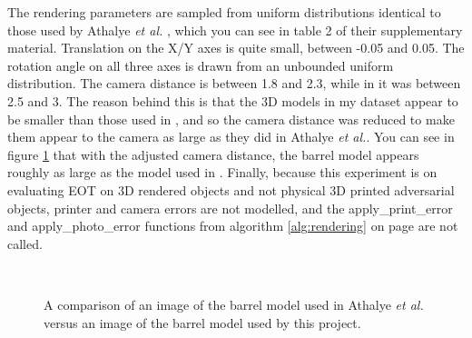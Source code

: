 The rendering parameters are sampled from uniform distributions identical to those used by Athalye \textit{et al.} \cite{athalye}, which you can see in table 2 of their supplementary material. Translation on the X/Y axes is quite small, between -0.05 and 0.05. The rotation angle on all three axes is drawn from an unbounded uniform distribution. The camera distance is between 1.8 and 2.3, while in \cite{athalye} it was between 2.5 and 3. The reason behind this is that the 3D models in my dataset appear to be smaller than those used in \cite{athalye}, and so the camera distance was reduced to make them appear to the camera as large as they did in Athalye \textit{et al.}. You can see in figure \ref{fig:barrel_comparison} that with the adjusted camera distance, the barrel model appears roughly as large as the model used in \cite{athalye}. Finally, because this experiment is on evaluating EOT on 3D rendered objects and not physical 3D printed adversarial objects, printer and camera errors are not modelled, and the apply\_print\_error and apply\_photo\_error functions from algorithm \ref{alg:rendering} on page \pageref{alg:rendering} are not called.

\begin{figure}[H]
\centering
{}~ %
\\ %

\caption[Comparison of the camera distances used in Athalye \textit{et al.} versus this project.]{A comparison of an image of the barrel model used in Athalye \textit{et al.} versus an image of the barrel model used by this project.}
\label{fig:barrel_comparison}
\end{figure}

